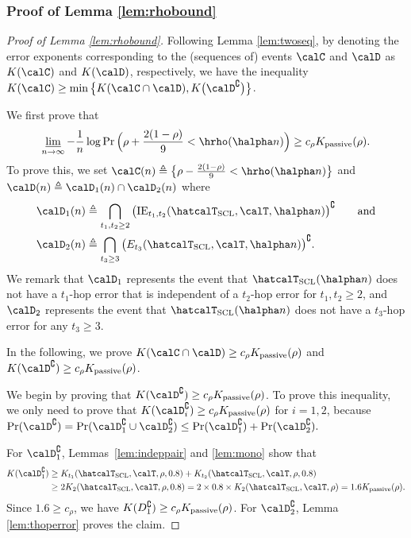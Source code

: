 \documentclass[11pt,onecolumn]{article}
\newcommand{\Passive}{{\rm passive}}
\begin{document}
\subsubsection{Proof of Lemma \ref{lem:rhobound}}
\begin{proof}[Proof of Lemma \ref{lem:rhobound}]
	Following Lemma \ref{lem:twoseq}, by denoting the error exponents corresponding to the (sequences of) events $ \calC$ and $\calD$ as $K ( \calC)$ and $K (\calD)$, respectively, we have  the inequality $K ( \calC)\geq \min\big\{K ( \calC\cap \calD),K \big(\calD^{\complement}\big)\big\}$.
	
	We first prove  that
	\begin{align}
	    \varliminf_{n\rightarrow\infty}-\frac{1}{n}\log\Pr\Big(\rho+\frac{2(1-\rho)}{9}<\hrho(\halpha n)\Big)\geq c_{\rho}K _{\Passive}(\rho).
	\end{align}
	To prove this, we set $ \calC(n)\triangleq\big\{\rho-\frac{2(1-\rho)}{9}<\hrho(\halpha n)\big\}$ and $\calD(n)\triangleq\calD_{1}(n)\cap \calD_{2}(n)$ where
	\begin{align}
		\calD_{1}(n)&\triangleq\bigcap_{t_{1},t_{2}\geq 2} \big(\mathrm{IE}_{t_{1},t_{2}}(\hatcalT_{{\rm SCL}},\calT,\halpha n)\big)^{\complement}\qquad\mbox{and}\\
		\calD_{2}(n)&\triangleq\bigcap_{t_{3}\geq 3}\big(E_{t_{3}}(\hatcalT_{{\rm SCL}},\calT,\halpha n)\big)^{\complement}.
	\end{align}
	We remark that $\calD_{1}$ represents the event that $\hatcalT_{\rm{SCL}}(\halpha n)$  does not have a $t_{1}$-hop error that is independent of a $t_{2}$-hop error for $t_{1},t_{2}\geq 2$, and $\calD_{2}$ represents  the event that $\hatcalT_{\rm{SCL}}(\halpha n)$ does not have a $t_3$-hop error for any $t_{3}\geq 3$.

	In the following, we   prove $K ( \calC\cap \calD)\geq c_{\rho}K _{\Passive}(\rho)$ and $K (\calD^{\complement})\geq c_{\rho}K _{\Passive}(\rho)$.

	We begin by proving that $K (\calD^{\complement})\geq c_{\rho}K _{\Passive}(\rho)$. To prove this inequality, we only need to prove that $K (\calD_{i}^{\complement})\geq c_{\rho}K _{\Passive}(\rho)$ for $i=1,2$, because $\Pr(\calD^{\complement})=\Pr(\calD_{1}^{\complement}\cup \calD_{2}^{\complement})\leq \Pr(\calD_{1}^{\complement})+\Pr(\calD_{2}^{\complement}).$
	
	For $\calD_{1}^{\complement}$, Lemmas~\ref{lem:indeppair} and \ref{lem:mono} show that 
	\begin{align}
		K (\calD_{1}^{\complement})&\geq K _{t_{1}}(\hatcalT_{\rm{SCL}},\calT,\rho,0.8)+K _{t_{2}}(\hatcalT_{\rm{SCL}},\calT,\rho,0.8)\\
		&\geq 2K _{2}(\hatcalT_{\rm{SCL}},\calT,\rho,0.8)
		= 2\times 0.8\times K _{2}(\hatcalT_{\rm{SCL}},\calT,\rho)
		=1.6 K _{\Passive}(\rho).
	\end{align}
	Since $1.6\geq c_{\rho}$, we have $K (D_{1}^{\complement})\geq c_{\rho}K _{\Passive}(\rho)$. 	For $\calD_{2}^{\complement}$, Lemma \ref{lem:thoperror} proves the claim.


\end{proof}
\end{document}
